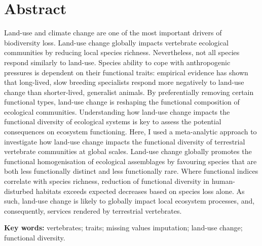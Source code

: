 \documentclass[11pt]{report}
\begin{document}




\chapter*{Abstract}
Land-use and climate change are one of the most important drivers of biodiversity loss. Land-use change globally impacts vertebrate ecological communities by reducing local species richness. Nevertheless, not all species respond similarly to land-use. Species ability to cope with anthropogenic pressures is dependent on their functional traits: empirical evidence has shown that long-lived, slow breeding specialists respond more negatively to land-use change than shorter-lived, generalist animals. By preferentially removing certain functional types, land-use change is reshaping the functional composition of ecological communities. Understanding how land-use change impacts the functional diversity of ecological systems is key to assess the potential consequences on ecosystem functioning. Here, I used a meta-analytic approach to investigate how land-use change impacts the functional diversity of terrestrial vertebrate communities at global scales. Land-use change globally promotes the functional homogenisation of ecological assemblages by favouring species that are both less functionally distinct and less functionally rare. Where functional indices correlate with species richness, reduction of functional diversity in human-disturbed habitats exceeds expected decreases based on species loss alone. As such, land-use change is likely to globally impact local ecosystem processes, and, consequently, services rendered by terrestrial vertebrates.

\vspace{1cm}
\textbf{Key words:} vertebrates; traits; missing values imputation; land-use change; functional diversity.


\clearpage
\tableofcontents

{}

\clearpage
\listoftables
{}

\listoffigures
\end{document}
